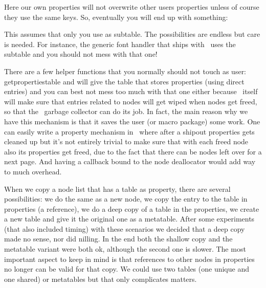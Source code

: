 \starttyping
{}
\stoptyping

Here our own properties will not overwrite other users properties unless of
course they use the same keys. So, eventually you will end up with something:

\starttyping
{}
\stoptyping

This assumes that only you use  as subtable. The possibilities are
endless but care is needed. For instance, the generic font handler that ships
with \CONTEXT\ uses the  subtable and you should not mess with
that one!

There are a few helper functions that you normally should not touch as user: \typ
{getpropertiestable} and will give the table that stores properties (using
direct entries) and you can best not mess too much with that one either because
\LUAMETATEX\ itself will make sure that entries related to nodes will get wiped when
nodes get freed, so that the \LUA\ garbage collector can do its job. In fact, the
main reason why we have this mechanism is that it saves the user (or macro
package) some work. One can easily write a property mechanism in \LUA\ where
after a shipout properties gets cleaned up but it's not entirely trivial to make
sure that with each freed node also its properties get freed, due to the fact
that there can be nodes left over for a next page. And having a callback bound to
the node deallocator would add way to much overhead.

When we copy a node list that has a table as property, there are several
possibilities: we do the same as a new node, we copy the entry to the table in
properties (a reference), we do a deep copy of a table in the properties, we
create a new table and give it the original one as a metatable. After some
experiments (that also included timing) with these scenarios we decided that a
deep copy made no sense, nor did nilling. In the end both the shallow copy and
the metatable variant were both ok, although the second one is slower. The most
important aspect to keep in mind is that references to other nodes in properties
no longer can be valid for that copy. We could use two tables (one unique and one
shared) or metatables but that only complicates matters.

